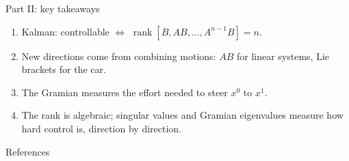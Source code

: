 \documentclass[10pt]{beamer}
\newcommand{\Kal}{\mathcal{K}}
\newcommand{\Gram}{\mathcal{G}}
\newcommand{\Reach}{\mathcal{R}}
\DeclareMathOperator{\Range}{Range}
\DeclareMathOperator{\rank}{rank}
\begin{document}
\begin{frame}{Part II: key takeaways}
\footnotesize
\begin{enumerate}
\item Kalman: controllable $\iff$ $\rank[B,AB,\dots,A^{n-1}B]=n$.
\item New directions come from combining motions: $AB$ for linear systems, Lie brackets for the car.
\item The Gramian measures the effort needed to steer $x^0$ to $x^1$.
\item The rank is algebraic; singular values and Gramian eigenvalues measure how hard control is, direction by direction.
\end{enumerate}
\end{frame}


\begin{frame}[allowframebreaks]{References}
\scriptsize


\end{frame}
\end{document}
